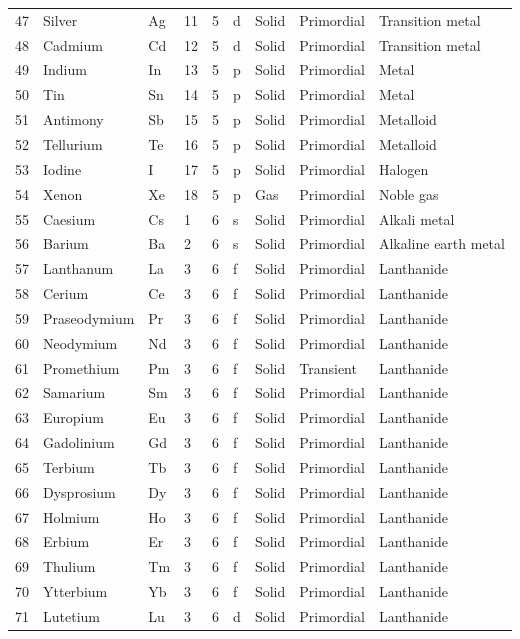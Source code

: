 \documentclass{article}
\begin{document}
\begin{tabular}{lllllllll}
47 & Silver & Ag & 11 & 5 & d & Solid & Primordial & Transition metal \\
48 & Cadmium & Cd & 12 & 5 & d & Solid & Primordial & Transition metal \\
49 & Indium & In & 13 & 5 & p & Solid & Primordial & Metal \\
50 & Tin & Sn & 14 & 5 & p & Solid & Primordial & Metal \\
51 & Antimony & Sb & 15 & 5 & p & Solid & Primordial & Metalloid \\
52 & Tellurium & Te & 16 & 5 & p & Solid & Primordial & Metalloid \\
53 & Iodine & I & 17 & 5 & p & Solid & Primordial & Halogen \\
54 & Xenon & Xe & 18 & 5 & p & Gas & Primordial & Noble gas \\
55 & Caesium & Cs & 1 & 6 & s & Solid & Primordial & Alkali metal \\
56 & Barium & Ba & 2 & 6 & s & Solid & Primordial & Alkaline earth metal \\
57 & Lanthanum & La & 3 & 6 & f & Solid & Primordial & Lanthanide \\
58 & Cerium & Ce & 3 & 6 & f & Solid & Primordial & Lanthanide \\
59 & Praseodymium & Pr & 3 & 6 & f & Solid & Primordial & Lanthanide \\
60 & Neodymium & Nd & 3 & 6 & f & Solid & Primordial & Lanthanide \\
61 & Promethium & Pm & 3 & 6 & f & Solid & Transient & Lanthanide \\
62 & Samarium & Sm & 3 & 6 & f & Solid & Primordial & Lanthanide \\
63 & Europium & Eu & 3 & 6 & f & Solid & Primordial & Lanthanide \\
64 & Gadolinium & Gd & 3 & 6 & f & Solid & Primordial & Lanthanide \\
65 & Terbium & Tb & 3 & 6 & f & Solid & Primordial & Lanthanide \\
66 & Dysprosium & Dy & 3 & 6 & f & Solid & Primordial & Lanthanide \\
67 & Holmium & Ho & 3 & 6 & f & Solid & Primordial & Lanthanide \\
68 & Erbium & Er & 3 & 6 & f & Solid & Primordial & Lanthanide \\
69 & Thulium & Tm & 3 & 6 & f & Solid & Primordial & Lanthanide \\
70 & Ytterbium & Yb & 3 & 6 & f & Solid & Primordial & Lanthanide \\
71 & Lutetium & Lu & 3 & 6 & d & Solid & Primordial & Lanthanide \\

\end{tabular}
\end{document}
